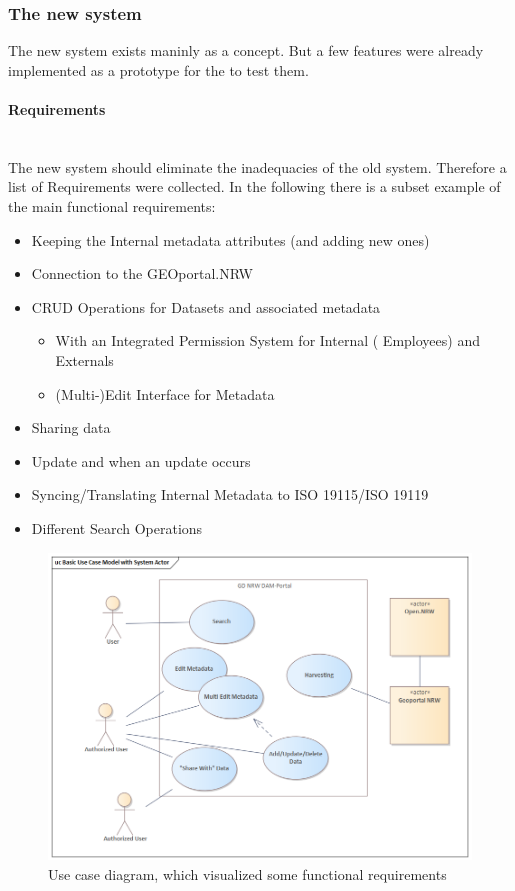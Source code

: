 \documentclass[11pt, titlepage, a4paper]{article}
\newcommand{\myparagraph}[1]{\paragraph{#1}\mbox{}\\}
\begin{document}
\subsubsection{The new system}
The new system exists maninly as a concept. But a few features were already implemented as a prototype for the  to test them.
\myparagraph{Requirements}
The new system should eliminate the inadequacies of the old system. Therefore a list of Requirements were collected. In the following there is a subset example of the main functional requirements:
\begin{itemize}
	\item Keeping the Internal metadata attributes (and adding new ones)
	\item Connection to the GEOportal.NRW
	\item CRUD Operations for Datasets and associated metadata
	      \begin{itemize}
		      \item With an Integrated Permission System for Internal ( Employees) and Externals
		      \item (Multi-)Edit Interface for Metadata
	      \end{itemize}
	\item Sharing data
	\item Update  and  when an update occurs
	\item Syncing/Translating Internal Metadata to ISO 19115/ISO 19119
	\item Different Search Operations
\end{itemize}


\begin{figure}[t]
	\caption{Use case diagram, which visualized some functional requirements}
	\label{fig:usecase}
	\includegraphics[width=16cm]{usecase_diagramm.png}
	\centering
\end{figure}
\end{document}
